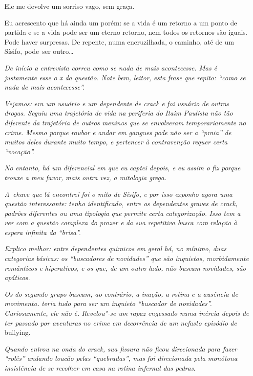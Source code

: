 Ele me devolve um sorriso vago, sem graça.

Eu acrescento que há ainda um porém: se a vida é um retorno a um ponto
de partida e se a vida pode ser um eterno retorno, nem todos os retornos
são iguais. Pode haver surpresas. De repente, numa encruzilhada, o
caminho, até de um Sísifo, pode~ser outro…

\begin{center}\asterisc{}\end{center}

\emph{De início a entrevista correu como se nada de mais acontecesse. Mas
é justamente esse o x da questão. Note bem, leitor, esta frase que
repito: ``como se nada de mais acontecesse''.}

\emph{Vejamos:  era um usuário e um dependente de crack e foi usuário
de outras drogas. Seguiu uma trajetória de vida na periferia do Itaim
Paulista não tão diferente da trajetória de outros meninos que se
envolveram temporariamente no crime. Mesmo porque roubar e andar em
gangues pode não ser a ``praia'' de muitos deles durante muito tempo, e
pertencer à contravenção requer certa ``vocação''.}

\emph{No entanto, há um diferencial em  que eu captei depois, e eu
assim o fiz porque trouxe a meu favor, mais outra vez, a mitologia
grega.}

\emph{A~chave que lá encontrei foi o mito de Sísifo, e por isso exponho
agora uma questão interessante: tenho identificado, entre os dependentes
graves de crack, padrões diferentes ou uma tipologia que permite certa
categorização. Isso tem a ver com a questão complexa do prazer e da sua
repetitiva busca com relação à espera infinita da ``brisa''.}

\emph{Explico melhor: entre dependentes químicos em geral há, no mínimo,
duas categorias básicas: os ``buscadores de novidades'' que são
inquietos, morbidamente românticos e hiperativos, e os que, de um outro
lado, não buscam novidades, são apáticos.}

\emph{Os do segundo grupo buscam, ao contrário, a inação, a rotina e a
ausência de movimento.  teria tudo para ser um inquieto ``buscador de
novidades''. Curiosamente, ele não é. Revelou"-se um rapaz engessado numa
inércia depois de ter passado por aventuras no crime em decorrência de
um nefasto episódio de} bullying.

\emph{Quando  entrou na onda do crack, sua fissura não ficou
direcionada para fazer ``rolês'' andando loucão pelas ``quebradas'', mas
foi direcionada pela monótona insistência de se recolher em casa na
rotina infernal das pedras.}


